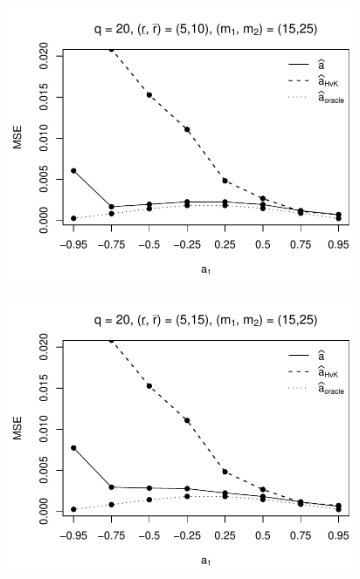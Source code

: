 \begin{figure}[p]
\begin{subfigure}[b]{0.45\textwidth}
\includegraphics[width=\textwidth]{Plots/Plots_Supplement/MSE_a_zoom_T=500_slope=10_(L1,L2,K1,K2,M1,M2)=(20,20,5,10,15,25).pdf}
\end{subfigure}
\hspace{0.25cm}
\begin{subfigure}[b]{0.45\textwidth}
\includegraphics[width=\textwidth]{Plots/Plots_Supplement/MSE_a_zoom_T=500_slope=10_(L1,L2,K1,K2,M1,M2)=(20,20,5,15,15,25).pdf}
\end{subfigure}


\end{figure}
